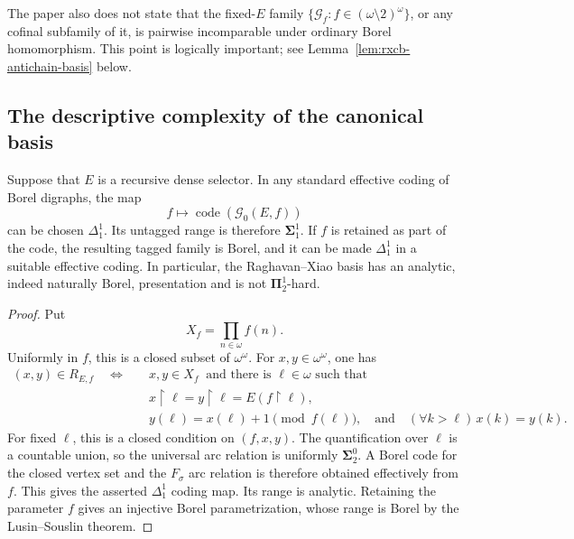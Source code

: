 The paper also does not state that the fixed-$E$ family
$\{\mathcal G_f:f\in(\omega\setminus2)^\omega\}$, or any cofinal
subfamily of it, is pairwise incomparable under ordinary Borel
homomorphism.  This point is logically important; see
Lemma~\ref{lem:rxcb-antichain-basis} below.

\subsection{The descriptive complexity of the canonical basis}
\label{subsec:rxcb-complexity}

\begin{proposition}
\label{prop:rxcb-basis-complexity}
Suppose that $E$ is a recursive dense selector.  In any standard
effective coding of Borel digraphs, the map
\[
  f\longmapsto \operatorname{code}(\mathcal G_0(E,f))
\]
can be chosen $\Delta^1_1$.  Its untagged range is therefore
$\boldsymbol\Sigma^1_1$.  If $f$ is retained as part of the code, the
resulting tagged family is Borel, and it can be made $\Delta^1_1$ in a
suitable effective coding.  In particular, the Raghavan--Xiao basis
has an analytic, indeed naturally Borel, presentation and is not
$\boldsymbol\Pi^1_2$-hard.
\end{proposition}

\begin{proof}
Put
\[
  X_f=\prod_{n\in\omega}f(n).
\]
Uniformly in $f$, this is a closed subset of $\omega^\omega$.  For
$x,y\in\omega^\omega$, one has
\begin{align*}
 (x,y)\in R_{E,f}
 \quad\Longleftrightarrow\quad
 &x,y\in X_f\ \text{ and there is }\ell\in\omega\text{ such that}\\
 &x\mathbin{\upharpoonright}\ell
   =y\mathbin{\upharpoonright}\ell
   =E(f\mathbin{\upharpoonright}\ell),\\
 &y(\ell)=x(\ell)+1\pmod{f(\ell)},\quad\text{and}\quad
   (\forall k>\ell)\,x(k)=y(k).
\end{align*}
For fixed $\ell$, this is a closed condition on $(f,x,y)$.  The
quantification over $\ell$ is a countable union, so the universal arc
relation is uniformly $\boldsymbol\Sigma^0_2$.  A Borel code for the
closed vertex set and the $F_\sigma$ arc relation is therefore
obtained effectively from $f$.  This gives the asserted
$\Delta^1_1$ coding map.  Its range is analytic.  Retaining the
parameter $f$ gives an injective Borel parametrization, whose range is
Borel by the Lusin--Souslin theorem.
\end{proof}

